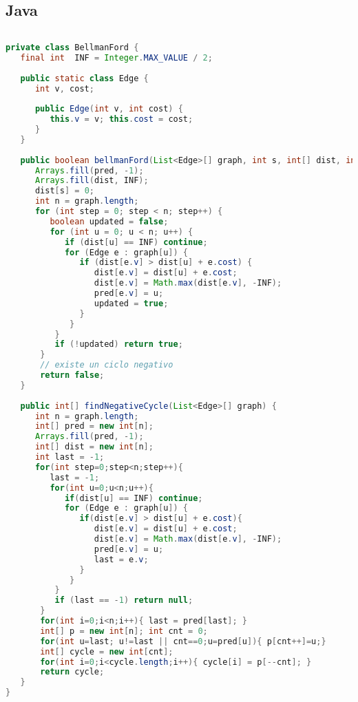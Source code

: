 \subsection{Java}
\begin{lstlisting}[language=Java]
	
private class BellmanFord {
   final int  INF = Integer.MAX_VALUE / 2;
   
   public static class Edge {
      int v, cost;
      
      public Edge(int v, int cost) {
         this.v = v; this.cost = cost;
      }
   }
	
   public boolean bellmanFord(List<Edge>[] graph, int s, int[] dist, int[] pred) {
      Arrays.fill(pred, -1);
      Arrays.fill(dist, INF);
      dist[s] = 0;
      int n = graph.length;
      for (int step = 0; step < n; step++) {
         boolean updated = false;
         for (int u = 0; u < n; u++) {
            if (dist[u] == INF) continue;
            for (Edge e : graph[u]) {
               if (dist[e.v] > dist[u] + e.cost) {
                  dist[e.v] = dist[u] + e.cost;
                  dist[e.v] = Math.max(dist[e.v], -INF);
                  pred[e.v] = u;
                  updated = true;
               }
             }
          }
          if (!updated) return true;
       }
       // existe un ciclo negativo
       return false;
   }
	
   public int[] findNegativeCycle(List<Edge>[] graph) {
      int n = graph.length;
      int[] pred = new int[n];
      Arrays.fill(pred, -1);
      int[] dist = new int[n];
      int last = -1;
      for(int step=0;step<n;step++){
         last = -1;
         for(int u=0;u<n;u++){
            if(dist[u] == INF) continue;
            for (Edge e : graph[u]) {
               if(dist[e.v] > dist[u] + e.cost){
                  dist[e.v] = dist[u] + e.cost;
                  dist[e.v] = Math.max(dist[e.v], -INF);
                  pred[e.v] = u;
                  last = e.v;
               }
             }
          }
          if (last == -1) return null;
       }
       for(int i=0;i<n;i++){ last = pred[last]; }
       int[] p = new int[n]; int cnt = 0;
       for(int u=last; u!=last || cnt==0;u=pred[u]){ p[cnt++]=u;}
       int[] cycle = new int[cnt];
       for(int i=0;i<cycle.length;i++){ cycle[i] = p[--cnt]; }
       return cycle;
   }
}
	
\end{lstlisting}